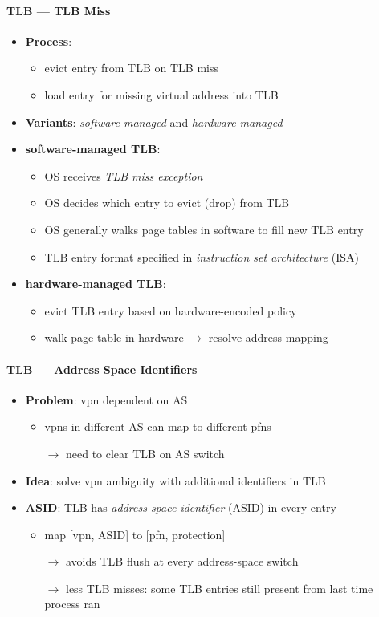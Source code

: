 \paragraph{TLB --- TLB Miss}
\begin{itemize}
  \item \textbf{Process}:
  \begin{itemize}
    \item evict entry from TLB on TLB miss
    \item load entry for missing virtual address into TLB
  \end{itemize}
  \item \textbf{Variants}: \emph{software-managed} and \emph{hardware managed}
  \item \textbf{software-managed TLB}:
  \begin{itemize}
    \item OS receives \emph{TLB miss exception}
    \item OS decides which entry to evict (drop) from TLB
    \item OS generally walks page tables in software to fill new TLB entry
    \item TLB entry format specified in \emph{instruction set architecture} (ISA)
  \end{itemize}
  \item \textbf{hardware-managed TLB}:
  \begin{itemize}
    \item evict TLB entry based on hardware-encoded policy
    \item walk page table in hardware $ \to $ resolve address mapping
  \end{itemize}
\end{itemize}

\paragraph{TLB --- Address Space Identifiers}
\begin{itemize}
  \item \textbf{Problem}: vpn dependent on AS
  \begin{itemize}
    \item vpns in different AS can map to different pfns
    \item[$ \to $] need to clear TLB on AS switch
  \end{itemize}
  \item \textbf{Idea}: solve vpn ambiguity with additional identifiers in TLB
  \item \textbf{ASID}: TLB has \emph{address space identifier} (ASID) in every entry
  \begin{itemize}
    \item map [vpn, ASID] to [pfn, protection]
    \item[$ \to $] avoids TLB flush at every address-space switch
    \item[$ \to $] less TLB misses: some TLB entries still present from last time process ran
  \end{itemize}
\end{itemize}

